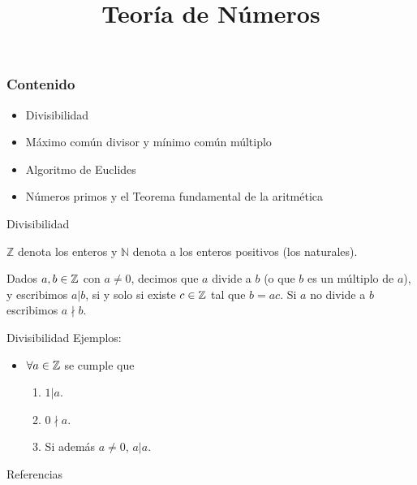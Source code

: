 \documentclass[14pt,compress,usenames,dvipsnames,aspectratio=169]{beamer}
\title{\textbf{Teoría de Números}}
\date{}
\begin{document}

\begin{frame}[plain]
\titlepage
\end{frame}

\begin{frame}
  \frametitle{Contenido}
  \begin{itemize}
    \item Divisibilidad 
    \item Máximo común divisor y mínimo común múltiplo
    \item Algoritmo de Euclides
    \item Números primos y el Teorema fundamental de la aritmética
  \end{itemize}
\end{frame}

\begin{frame}{Divisibilidad}
    \begin{notation}
        $\mathbb{Z}$ denota los enteros y $\mathbb{N}$ denota a los enteros positivos (los naturales).
    \end{notation}
    
    
    \begin{defi}[Divisibilidad]
    Dados $a,b \in \mathbb{Z}$ con $a\neq 0$, decimos que $a$ divide a $b$ (o que $b$ es un múltiplo de $a$), y escribimos $a | b$, si y solo si existe $c \in \mathbb{Z}$ tal que $b=ac$. Si $a$ no divide  a $b$ escribimos $a\nmid b$.
    \end{defi}
\end{frame}

\begin{frame}{Divisibilidad}
    Ejemplos:
    \begin{itemize}
        \item $\forall a\in \mathbb{Z}$ se cumple que
        \begin{enumerate}
        \item $1|a$.
        \item $0\nmid a$.
        \item Si además $a\neq 0$, $a|a$.
        \end{enumerate}
    \end{itemize}
\end{frame}

\begin{frame}{Referencias}
    
    \nocite{*}
    
\end{frame}
\end{document}
